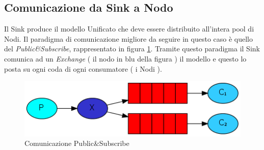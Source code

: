     \subsection{Comunicazione da Sink a Nodo}
      Il Sink produce il modello Unificato che deve essere distribuito all'intera pool di Nodi. Il paradigma di comunicazione migliore da seguire in questo caso è quello del \textit{Public\&Subscribe}, rappresentato in figura \ref{fig:PublicSubscribe}. Tramite questo paradigma il Sink comunica ad un \textit{Exchange} ( il nodo in blu della figura ) il modello e questo lo posta su ogni coda di ogni consumatore ( i Nodi ).
      \begin{figure}[h!]
        \centering
        \includegraphics[scale=0.7]{../Immagini/PublicSubscribe.png}
        \caption{Comunicazione Public\&Subscribe}
        \label{fig:PublicSubscribe}
      \end{figure}

